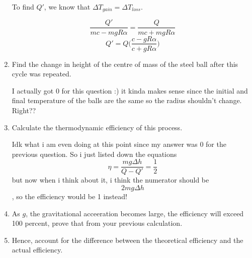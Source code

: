 \documentclass{scrartcl}
\begin{document}
\begin{enumerate}
            To find $Q'$, we know that $\Delta T_{gain}=\Delta T_{loss}$.

            $$\frac{Q'}{mc-mgR\alpha}=\frac{Q}{mc+mgR\alpha}$$
            $$Q'=Q \bigg(\frac{c-gR\alpha}{c+gR\alpha}\bigg)$$

      \item Find the change in height of the centre of mass of the steel ball after this cycle was repeated.

            I actually got 0 for this question :) it kinda makes sense since the initial and final temperature of the balls are the same so the radius shouldn't change. Right??
      \item Calculate the thermodynamic efficiency of this process.

            Idk what i am even doing at this point since my answer was 0 for the previous question. So i just listed down the equations
            $$\eta=\frac{mg\Delta h}{Q-Q'}=\frac{1}{2}$$
            but now when i think about it, i think the numerator should be $$2mg\Delta h$$, so the efficiency would be 1 instead!
      \item As $g$, the gravitational acceeration becomes large, the efficiency will exceed 100 percent, prove that from your previous calculation.
      \item Hence, account for the difference between the theoretical efficiency and the actual efficiency.
\end{enumerate}
\end{document}
